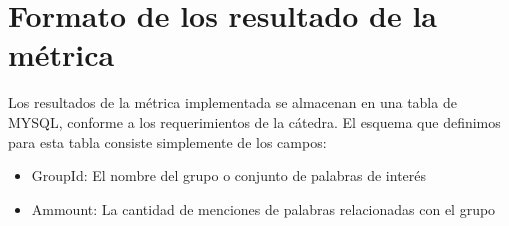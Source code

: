 \documentclass[a4paper,10pt]{article}
\begin{document}
\section{Formato de los resultado de la métrica}

Los resultados de la métrica implementada se almacenan en una tabla de MYSQL, conforme a los requerimientos de la cátedra. El esquema que definimos para esta tabla consiste
simplemente de los campos:

\begin{itemize}
    \item GroupId: El nombre del grupo o conjunto de palabras de interés
    \item Ammount: La cantidad de menciones de palabras relacionadas con el grupo
\end{itemize}
\end{document}
